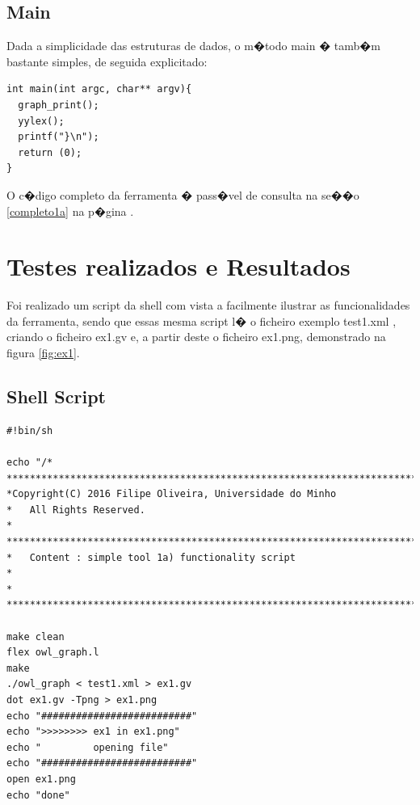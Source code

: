 \documentclass{report}
\begin{document}
\subsection{Main}
Dada a simplicidade das estruturas de dados, o m�todo main � tamb�m bastante simples, de seguida explicitado:
\begin{lstlisting}
int main(int argc, char** argv){
  graph_print();
  yylex();
  printf("}\n");
  return (0);
}
\end{lstlisting}
O c�digo completo da ferramenta � pass�vel de consulta na se��o \ref{completo1a} na p�gina \pageref{completo1a}.

\section{Testes realizados e Resultados}
Foi realizado um script da shell com vista a facilmente ilustrar as funcionalidades da ferramenta, sendo que essas mesma script l� o ficheiro exemplo test1.xml , criando o ficheiro ex1.gv e, a partir deste o ficheiro ex1.png, demonstrado na figura \ref{fig:ex1}.
\subsection{Shell Script}
\begin{lstlisting}
#!bin/sh

echo "/*
********************************************************************************
*Copyright(C) 2016 Filipe Oliveira, Universidade do Minho
*   All Rights Reserved.
*
********************************************************************************
*   Content : simple tool 1a) functionality script 
*
*
********************************************************************************/"

make clean
flex owl_graph.l
make 
./owl_graph < test1.xml > ex1.gv
dot ex1.gv -Tpng > ex1.png
echo "##########################"
echo ">>>>>>>> ex1 in ex1.png"
echo "         opening file"
echo "##########################"
open ex1.png
echo "done"
\end{lstlisting}
\end{document}
